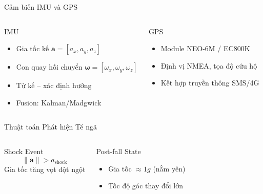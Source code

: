 \begin{frame}{Cảm biến IMU và GPS}
\begin{columns}
\begin{block}{IMU}
\begin{itemize}
\item Gia tốc kế $\mathbf{a}=[a_x,a_y,a_z]$
\item Con quay hồi chuyển $\boldsymbol{\omega}=[\omega_x,\omega_y,\omega_z]$
\item Từ kế – xác định hướng
\item Fusion: Kalman/Madgwick
\end{itemize}
\end{block}

\begin{exampleblock}{GPS}
\begin{itemize}
\item Module NEO-6M / EC800K
\item Định vị NMEA, tọa độ cứu hộ
\item Kết hợp truyền thông SMS/4G
\end{itemize}
\end{exampleblock}
\end{columns}
\end{frame}

\begin{frame}{Thuật toán Phát hiện Té ngã}
\begin{columns}
\begin{alertblock}{Shock Event}
$$\|\mathbf{a}\| > a_{\text{shock}}$$
Gia tốc tăng vọt đột ngột
\end{alertblock}

\begin{alertblock}{Post-fall State}
\begin{itemize}
\item Gia tốc $\approx 1g$ (nằm yên)
\item Tốc độ góc thay đổi lớn
\end{itemize}
\end{alertblock}
\end{columns}
\end{frame}

